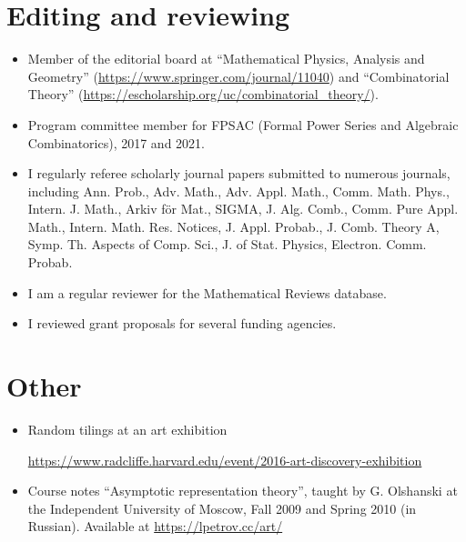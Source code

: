 \documentclass[letterpaper,11pt]{article}
\begin{document}
\section*{Editing and reviewing}

\begin{itemize}
	\item
	Member of the editorial board at ``Mathematical Physics, Analysis and Geometry'' (\url{https://www.springer.com/journal/11040}) and ``Combinatorial Theory'' (\url{https://escholarship.org/uc/combinatorial_theory/}).
	\item Program committee member for FPSAC (Formal Power Series and Algebraic Combinatorics),
		2017 and 2021.
	\item 
	I regularly referee scholarly journal papers submitted to numerous journals, 
	including
	Ann. Prob., Adv. Math., Adv. Appl. Math., Comm. Math. Phys., Intern. J. Math.,
	Arkiv f\"or Mat., SIGMA, J. Alg. Comb., Comm. Pure Appl. Math., Intern. Math.
	Res. Notices, J. Appl. Probab., J. Comb. Theory A, Symp. Th. Aspects of Comp.
	Sci., J. of Stat. Physics, Electron. Comm. Probab. 
	\item
	I am a regular
	reviewer for the Mathematical Reviews database. 
	\item
	I reviewed grant proposals for several funding agencies.
\end{itemize}

\section*{Other}

\begin{itemize}

	\item
	Random tilings at an art exhibition

	\url{https://www.radcliffe.harvard.edu/event/2016-art-discovery-exhibition}
	\item
	Course notes 
	``Asymptotic representation theory'',
	taught by G. Olshanski 
	at the Independent University of Moscow,
	Fall 2009 and Spring 2010 (in Russian). 
	Available at \url{https://lpetrov.cc/art/}

\end{itemize}
\end{document}
